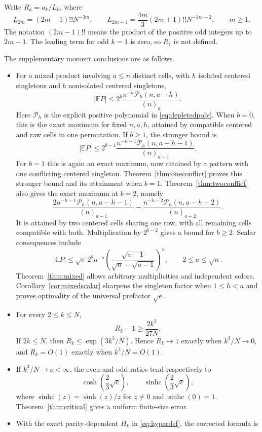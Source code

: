 \documentclass[11pt]{article}
\theoremstyle{definition}
\theoremstyle{remark}
\newcommand{\E}{\mathbb E}
\newcommand{\1}{\mathbf 1}
\newcommand{\shc}{\operatorname{sinhc}}
\begin{document}
Write $R_k=a_k/L_k$, where
\begin{equation}\label{eq:leading}
L_{2m}=(2m-1)!!N^{-3m},\qquad
L_{2m+1}=\frac{4m}{3}(2m+1)!!N^{-3m-2},\qquad m\ge1.
\end{equation}
The notation $(2m-1)!!$ means the product of the positive odd integers up to $2m-1$. The leading term for odd $k=1$ is zero, so $R_1$ is not defined.

The supplementary moment conclusions are as follows.
\begin{itemize}
\item For a mixed product involving $a\le n$ distinct cells, with $h$ isolated centered singletons and $b$ nonisolated centered singletons,
\[
|\E P|\le2^b\frac{n^{-h}\mathcal P_h(n,a-h)}{(n)_a}.
\]
Here $\mathcal P_h$ is the explicit positive polynomial in \eqref{eq:depletedpoly}. When $b=0$, this is the exact maximum for fixed $n,a,h$, attained by compatible centered and raw cells in one permutation. If $b\ge1$, the stronger bound is
\[
|\E P|\le2^{b-1}\frac{n^{-h-1}\mathcal P_h(n,a-h-1)}{(n)_{a-1}}.
\]
For $b=1$ this is again an exact maximum, now attained by a pattern with one conflicting centered singleton. Theorem~\ref{thm:oneconflict} proves this stronger bound and its attainment when $b=1$. Theorem~\ref{thm:twoconflict} also gives the exact maximum at $b=2$, namely
\[
\frac{2n^{-h-1}\mathcal P_h(n,a-h-1)}{(n)_{a-1}}
-\frac{n^{-h-2}\mathcal P_h(n,a-h-2)}{(n)_{a-2}}.
\]
It is attained by two centered cells sharing one row, with all remaining cells compatible with both. Multiplication by $2^{b-2}$ gives a bound for $b\ge2$. Scalar consequences include
\[
|\E P|\le\sqrt e\,2^b n^{-a}
\left(\frac{\sqrt{a-1}}{\sqrt n-\sqrt{a-1}}\right)^h,
\qquad 2\le a\le\sqrt n.
\]
Theorem~\ref{thm:mixed} allows arbitrary multiplicities and independent colors. Corollary~\ref{cor:mixedscalar} sharpens the singleton factor when $1\le h<a$ and proves optimality of the universal prefactor $\sqrt e$.
\item For every $2\le k\le N$,
\[
R_k-1\ge\frac{2k^3}{27N}.
\]
If $2k\le N$, then $R_k\le\exp(3k^3/N)$. Hence $R_k\to1$ exactly when $k^3/N\to0$, and $R_k=O(1)$ exactly when $k^3/N=O(1)$.
\item If $k^3/N\to c<\infty$, the even and odd ratios tend respectively to
\[
\cosh\left(\frac23\sqrt c\right),\qquad
\shc\left(\frac23\sqrt c\right),
\]
where $\shc(z)=\sinh(z)/z$ for $z\ne0$ and $\shc(0)=1$. Theorem~\ref{thm:critical} gives a uniform finite-size error.
\item With the exact parity-dependent $H_k$ in \eqref{eq:hyperdef}, the corrected formula is

\end{itemize}
\end{document}
